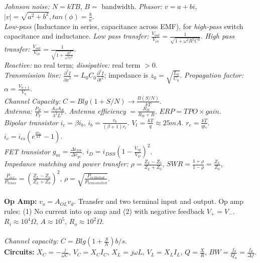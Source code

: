 \emph{Johnson noise:} $N=kTB$, $B=$ bandwidth.
\emph{Phasor:} $v=a+bi$, $|v|= \sqrt{a^2+b^2}, tan(\phi)= {\frac b a}$. \\
\emph{Low-pass} (Inductance in series, capacitance across EMF), 
for \emph{high-pass} switch capacitance and inductance. 
\emph{Low pass transfer:} ${\frac {V_{out}} {V_{in}}} = {\frac 1 {\sqrt{1+ \omega^2 R^2 C^2}}}$.
\emph{High pass transfer:} 
${\frac {V_{out}} {V_{in}}} = {\frac 1 {\sqrt{1+ {\frac {R^2} {\omega^2 C^2}}}}}$. \\
\emph{Reactive:} no real term;
\emph{dissipative:} real term $>0$.  \\
\emph{Transmission line:}
${\frac {\partial^2 I} {{\partial x}^2}} = L_0 C_0 {\frac {\partial^2 I} {{\partial t}^2}}$;
impedance is $z_0 = {\sqrt {\frac {L_0} {C_0}}}$.
\emph{Propagation factor:}
$\alpha= {\frac {V_{n+1}} {V_n}}$.  \\
\emph{Channel Capacity:} $C= B lg(1+S/N) \rightarrow {\frac {B (S/N)} {kT}}$. \\
\emph{Antenna:} ${\frac {P_R} {P_T}}= {\frac {A_T A_R} {\lambda^2 L^2}}$.
\emph{Antenna efficiency} $= {\frac {R_R} {R_R+R}}$.
$ERP= TPO \times gain$.\\
\emph{Bipolar transistor} $i_c= \beta i_b$, $i_b = {\frac {v_b}{(\beta + 1)r_e}}$. 
$V_t= {\frac {kT}q} \approx 25mA$.  $r_e= {\frac {kT}{q i_c}}$.
$i_c= i_{cs} (e^{\frac {qv_{be}} {kT}} -1)$.
\\
\emph{FET transistor} $g_m = {\frac {\Delta i_{DS}} {\Delta v_{gs}}}$.  $i_D = i_{DSS} (1-{\frac {V_{sg}} {V_P}})^2$.
\\
\emph{Impedance matching and power transfer:}
$\rho={\frac {Z_L-Z_0} {Z_L+Z_0}}$, 
$SWR= {\frac {1+\rho} {1-\rho}}= {\frac {Z_L}{Z_0}}$,
${\frac {P_{ref}} {P_{trans}}}= ({\frac {Z_L-Z_0} {Z_L+Z_0}})^2$,
$\rho= {\sqrt {\frac {P_{reflected}} {P_{transmitted}}}}$.
\\
\\
{\bf Op Amp:} $ v_o= A_{OL}v_d$.  Transfer and two terminal input and output.
Op amp rules: (1) No current into op amp and
(2) with negative feedback $V_+ = V_-$.
$R_i \approx 10^4 \Omega$, $A \approx 10^5$, $R_o \approx 10^2 \Omega$.    
\\
\\
\emph{Channel capacity:} $C= B lg(1+{\frac S N}) b/s$.
\\
{\bf Circuits:}
$X_C= -{\frac j {\omega C}}$, $V_C= X_C I_C$,
$X_L=  j \omega L$, $V_L= X_L I_L$,
$Q= {\frac X R}$, $BW= {\frac {f_0} {Q_u}} =
{\frac {f_0} {\Delta f}}$. \\
